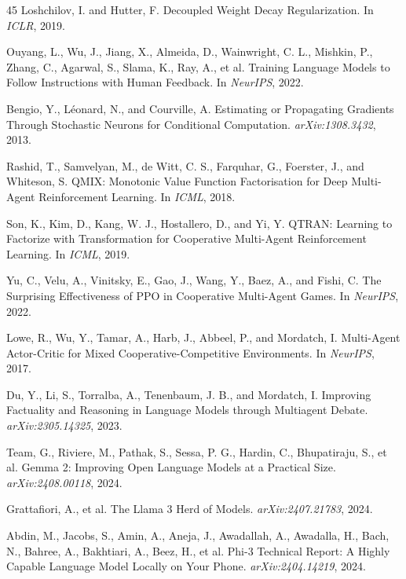 \documentclass{article}
\begin{document}
\begin{thebibliography}{45}
 Loshchilov, I. and Hutter, F. Decoupled Weight Decay Regularization. In \emph{ICLR}, 2019.

 Ouyang, L., Wu, J., Jiang, X., Almeida, D., Wainwright, C. L., Mishkin, P., Zhang, C., Agarwal, S., Slama, K., Ray, A., et al. Training Language Models to Follow Instructions with Human Feedback. In \emph{NeurIPS}, 2022.

 Bengio, Y., L\'{e}onard, N., and Courville, A. Estimating or Propagating Gradients Through Stochastic Neurons for Conditional Computation. \emph{arXiv:1308.3432}, 2013.

 Rashid, T., Samvelyan, M., de Witt, C. S., Farquhar, G., Foerster, J., and Whiteson, S. QMIX: Monotonic Value Function Factorisation for Deep Multi-Agent Reinforcement Learning. In \emph{ICML}, 2018.

 Son, K., Kim, D., Kang, W. J., Hostallero, D., and Yi, Y. QTRAN: Learning to Factorize with Transformation for Cooperative Multi-Agent Reinforcement Learning. In \emph{ICML}, 2019.

 Yu, C., Velu, A., Vinitsky, E., Gao, J., Wang, Y., Baez, A., and Fishi, C. The Surprising Effectiveness of PPO in Cooperative Multi-Agent Games. In \emph{NeurIPS}, 2022.

 Lowe, R., Wu, Y., Tamar, A., Harb, J., Abbeel, P., and Mordatch, I. Multi-Agent Actor-Critic for Mixed Cooperative-Competitive Environments. In \emph{NeurIPS}, 2017.

 Du, Y., Li, S., Torralba, A., Tenenbaum, J. B., and Mordatch, I. Improving Factuality and Reasoning in Language Models through Multiagent Debate. \emph{arXiv:2305.14325}, 2023.

 Team, G., Riviere, M., Pathak, S., Sessa, P. G., Hardin, C., Bhupatiraju, S., et al. Gemma 2: Improving Open Language Models at a Practical Size. \emph{arXiv:2408.00118}, 2024.

 Grattafiori, A., et al. The Llama 3 Herd of Models. \emph{arXiv:2407.21783}, 2024.

 Abdin, M., Jacobs, S., Amin, A., Aneja, J., Awadallah, A., Awadalla, H., Bach, N., Bahree, A., Bakhtiari, A., Beez, H., et al. Phi-3 Technical Report: A Highly Capable Language Model Locally on Your Phone. \emph{arXiv:2404.14219}, 2024.

\end{thebibliography}
\end{document}
